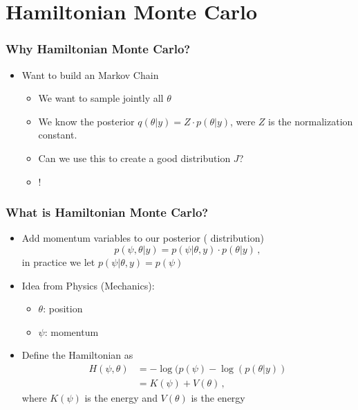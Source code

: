 \documentclass[10pt]{beamer}
\begin{document}

\section{Hamiltonian Monte Carlo}
\frame{\sectionpage}

\begin{frame}
\frametitle{Why Hamiltonian Monte Carlo?}

\begin{itemize}
\item Want to build an  Markov Chain
\begin{itemize}
\item We want to sample jointly all $\theta$
\item We know the  posterior $q(\theta|y)=Z \cdot p(\theta|y)$, were $Z$ is the normalization constant.
\item Can we use this to create a good  distribution $J$?
\pause
\item {}!
\end{itemize}
\end{itemize}

\end{frame}


\begin{frame}
\frametitle{What is Hamiltonian Monte Carlo?}

\begin{itemize}
\item Add momentum variables to our posterior ( distribution)
\[
 p(\psi,\theta | y) = p(\psi | \theta , y) \cdot p(\theta | y)\,,
\]
in practice we let $p(\psi | \theta , y) = p(\psi)$
\pause
\item Idea from Physics (Mechanics):
\begin{itemize}
\item $\theta$: position
\item $\psi$: momentum
\end{itemize}
\pause
\item Define the Hamiltonian as
\begin{align}
H(\psi, \theta)  & = - \log(p(\psi) - \log(p(\theta | y))\\
 & = K(\psi) + V(\theta)\,,
\end{align}
where $K(\psi)$ is the  energy and $V(\theta)$ is the  energy
\end{itemize}
\end{frame}
\end{document}
